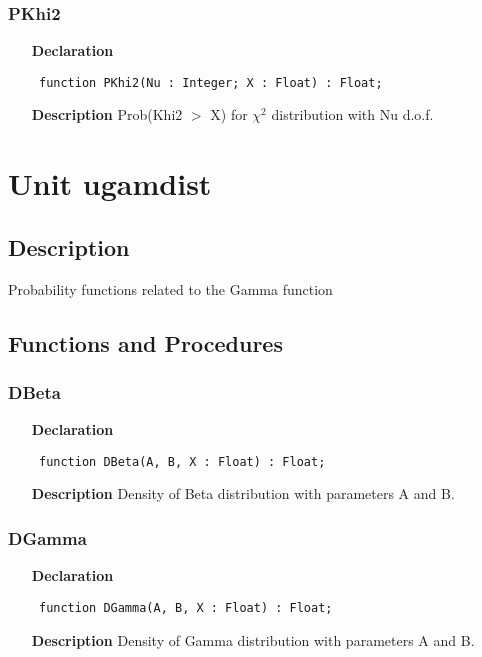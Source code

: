 \documentclass[12pt,a4paper,oneside]{report}
\newcommand{\declarationitem}[1]{\textbf{#1}}
\newcommand{\descriptiontitle}[1]{\textbf{#1}}
\newcommand{\code}[1]{\texttt{#1}}
\begin{document}
\subsubsection{PKhi2}
\label{uigmdist-PKhi2}
\begin{itemize}\item[\declarationitem{Declaration}\hfill]
	\begin{flushleft}
		\code{
			function PKhi2(Nu : Integer; X : Float) : Float;}
	\end{flushleft}
	\item[\descriptiontitle{Description}]
	Prob(Khi2 {$>$} X) for $\chi^2$ distribution with Nu d.o.f.
\end{itemize}
\section{Unit ugamdist}
\label{ugamdist}
\subsection{Description}
Probability functions related to the Gamma function 
\subsection{Functions and Procedures}
\subsubsection{DBeta}
\label{ugamdist-DBeta}
\begin{itemize}\item[\declarationitem{Declaration}\hfill]
	\begin{flushleft}
		\code{
			function DBeta(A, B, X : Float) : Float;}
	\end{flushleft}
	\item[\descriptiontitle{Description}]
	Density of Beta distribution with parameters A and B.
\end{itemize}
\subsubsection{DGamma}
\label{ugamdist-DGamma}
\begin{itemize}\item[\declarationitem{Declaration}\hfill]
	\begin{flushleft}
		\code{
			function DGamma(A, B, X : Float) : Float;}
	\end{flushleft}
	\item[\descriptiontitle{Description}]
	Density of Gamma distribution with parameters A and B.
\end{itemize}
\end{document}
